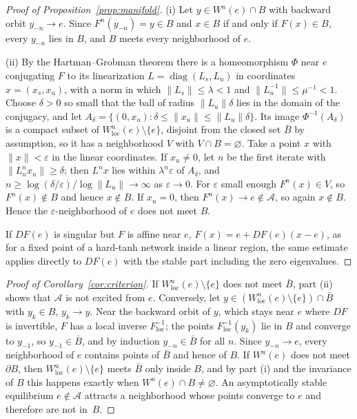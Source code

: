 \begin{proof}[Proof of Proposition~\ref{prop:manifold}]
(i) Let $y\in W^u(e)\cap B$ with backward orbit $y_{-n}\to e$. Since $F^n(y_{-n})=y\in B$ and $x\in B$ if and only if
$F(x)\in B$, every $y_{-n}$ lies in $B$, and $B$ meets every neighborhood of $e$.

(ii) By the Hartman--Grobman theorem\cite{Hartman1960Lemma,Grobman1959Homeo,KatokHasselblatt1995Intro} there is a
homeomorphism $\Phi$ near $e$ conjugating $F$ to its linearization $L=\operatorname{diag}(L_s,L_u)$ in coordinates
$x=(x_s,x_u)$, with a norm in which $\|L_s\|\le\lambda<1$ and $\|L_u^{-1}\|\le\mu^{-1}<1$. Choose $\delta>0$ so small that the
ball of radius $\|L_u\|\delta$ lies in the domain of the conjugacy, and let $A_\delta=\{(0,x_u):\delta\le\|x_u\|\le\|L_u\|\delta\}$.
Its image $\Phi^{-1}(A_\delta)$ is a compact subset of $W^u_{\mathrm{loc}}(e)\setminus\{e\}$, disjoint from the closed set
$\bar B$ by assumption, so it has a neighborhood $V$ with $V\cap B=\varnothing$. Take a point $x$ with $\|x\|<\varepsilon$ in the
linear coordinates. If $x_u\neq0$, let $n$ be the first iterate with $\|L_u^nx_u\|\ge\delta$; then $L^nx$ lies within
$\lambda^n\varepsilon$ of $A_\delta$, and $n\ge\log(\delta/\varepsilon)/\log\|L_u\|\to\infty$ as $\varepsilon\to0$. For
$\varepsilon$ small enough $F^n(x)\in V$, so $F^n(x)\notin B$ and hence $x\notin B$. If $x_u=0$, then $F^n(x)\to e\notin\mathcal{A}$,
so again $x\notin B$. Hence the $\varepsilon$-neighborhood of $e$ does not meet $B$.

If $DF(e)$ is singular but $F$ is affine near $e$, $F(x)=e+DF(e)(x-e)$, as for a fixed point of a hard-tanh network inside a
linear region, the same estimate applies directly to $DF(e)$ with the stable part including the zero eigenvalues.
\end{proof}

\begin{proof}[Proof of Corollary~\ref{cor:criterion}]
If $W^u_{\mathrm{loc}}(e)\setminus\{e\}$ does not meet $\bar B$, part (ii) shows that $\mathcal{A}$ is not excited from $e$.
Conversely, let $y\in(W^u_{\mathrm{loc}}(e)\setminus\{e\})\cap\bar B$ with $y_k\in B$, $y_k\to y$. Near the backward orbit of
$y$, which stays near $e$ where $DF$ is invertible, $F$ has a local inverse $F^{-1}_{\mathrm{loc}}$; the points
$F^{-1}_{\mathrm{loc}}(y_k)$ lie in $B$ and converge to $y_{-1}$, so $y_{-1}\in\bar B$, and by induction $y_{-n}\in\bar B$ for all
$n$. Since $y_{-n}\to e$, every neighborhood of $e$ contains points of $\bar B$ and hence of $B$. If $W^u(e)$ does not meet
$\partial B$, then $W^u_{\mathrm{loc}}(e)\setminus\{e\}$ meets $\bar B$ only inside $B$, and by part (i) and the invariance of
$B$ this happens exactly when $W^u(e)\cap B\neq\varnothing$. An asymptotically stable equilibrium $e\notin\mathcal{A}$ attracts a
neighborhood whose points converge to $e$ and therefore are not in~$B$.
\end{proof}


